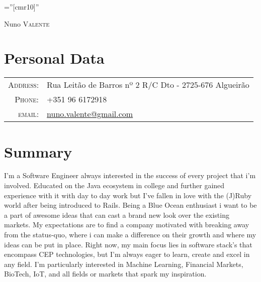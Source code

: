 \documentclass[a4paper,10pt]{article}
\begin{document}
\pagestyle{empty} %

\font\fb=''[cmr10]'' %

\par{\centering
  {\Huge Nuno \textsc{Valente}
}\bigskip\par}

\section{Personal Data}

\begin{tabular}{rl}
    \textsc{Address:}   & Rua Leitão de Barros nº 2 R/C Dto - 2725-676 Algueirão\\
    \textsc{Phone:}     & +351 96 6172918\\
    \textsc{email:}     & \href{mailto:nuno.valente@gmail.com}{nuno.valente@gmail.com} \\
\end{tabular}

\section{Summary}
I'm a Software Engineer always interested in the success of every project that i'm involved.
Educated on the Java ecosystem in college and further gained experience with it with day to day work but I've fallen in love with the (J)Ruby world after being introduced to Rails.
Being a Blue Ocean enthusiast i want to be a part of awesome ideas that can cast a brand new look over the existing markets.
My expectations are to find a company motivated with breaking away from the status-quo, where i can make a difference on their growth and where my ideas can be put in place.
Right now, my main focus lies in software stack's that encompass CEP technologies, but  I'm always eager to learn, create and excel in any field. 
I'm particularly interested in Machine Learning, Financial Markets, BioTech, IoT, and all fields or markets that spark my inspiration.

\end{document}
